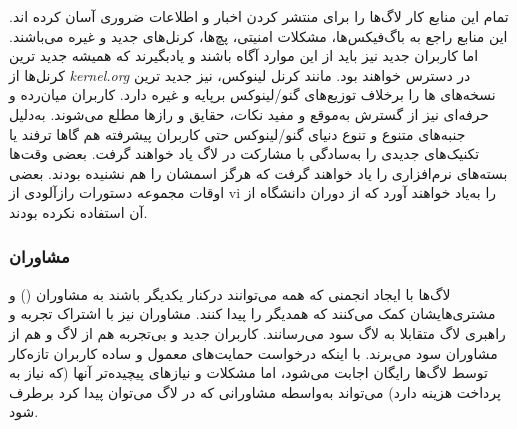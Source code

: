 تمام این منابع کار لاگ‌ها را برای منتشر کردن اخبار و اطلاعات
ضروری آسان کرده اند. این منابع راجع به باگ‌فیکس‌ها،
مشکلات امنیتی، پچ‌ها، کرنل‌های جدید و غیره می‌باشند.
اما کاربران جدید نیز باید از این موارد آگاه باشند
و یادبگیرند که همیشه جدید ترین کرنل‌ها از
\emph{kernel.org}
در دسترس خواهند بود. مانند کرنل لینوکس،
نیز جدید ترین نسخه‌های ‌ها را برخلاف
توزیع‌های گنو/لینوکس برپایه  و غیره دارد.
کاربران میان‌رده و حرفه‌ای نیز از گسترش به‌موقع و مفید
نکات، حقایق و رازها مطلع می‌شوند.
به‌دلیل جنبه‌های متنوع و تنوع دنیای گنو/لینوکس حتی
کاربران پیشرفته هم گاها ترفند یا تکنیک‌های جدیدی را
به‌سادگی با مشارکت در لاگ یاد خواهند گرفت.
بعضی وقت‌ها بسته‌های نرم‌افزاری را یاد خواهند گرفت که
هرگز اسمشان را هم نشنیده بودند. بعضی اوقات مجموعه دستورات
رازآلودی از {\ttfamily vi} را به‌یاد خواهند آورد که از دوران
دانشگاه از آن استفاده نکرده بودند.

\subsubsection{مشاوران }

لاگ‌ها با ایجاد انجمنی که همه می‌توانند درکنار یکدیگر باشند
به مشاوران
()
 و مشتری‌هایشان کمک می‌کنند که همدیگر را پیدا کنند.
مشاوران نیز با اشتراک تجربه و راهبری لاگ‌ متقابلا به لاگ سود می‌رسانند.
کاربران جدید و بی‌تجربه هم از لاگ و هم از مشاوران سود می‌برند.
با اینکه درخواست حمایت‌های معمول و ساده کاربران تازه‌کار توسط لاگ‌ها
رایگان اجابت می‌شود، اما مشکلات و نیازهای پیچیده‌تر آنها (که نیاز
به پرداخت هزینه دارد) می‌تواند به‌واسطه مشاورانی که در لاگ می‌توان پیدا
کرد برطرف شود.


